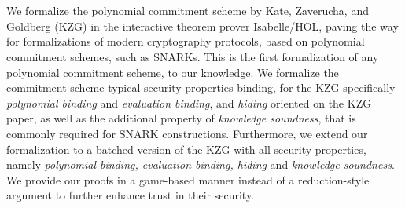 \chapter{\abstractname}

We formalize the polynomial commitment scheme by Kate, Zaverucha, and Goldberg (KZG) in the interactive theorem prover Isabelle/HOL, paving the way for formalizations of modern cryptography protocols, based on polynomial commitment schemes, such as SNARKs. This is the first formalization of any polynomial commitment scheme, to our knowledge. We formalize the commitment scheme typical security properties binding, for the KZG specifically \textit{polynomial binding} and \textit{evaluation binding}, and \textit{hiding} oriented on the KZG paper, as well as the additional property of \textit{knowledge soundness}, that is commonly required for SNARK constructions. Furthermore, we extend our formalization to a batched version of the KZG with all security properties, namely \textit{polynomial binding, evaluation binding, hiding} and \textit{knowledge soundness}.
We provide our proofs in a game-based manner instead of a reduction-style argument to further enhance trust in their security.